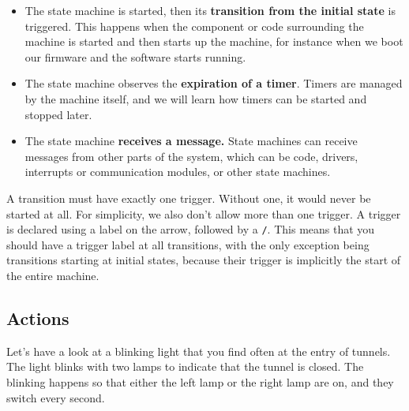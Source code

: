 \documentclass[10pt, twoside, twocolumn]{book}
\providecommand{\tightlist}{%
  \setlength{\itemsep}{0pt}\setlength{\parskip}{0pt}}
\begin{document}
\begin{itemize}
\tightlist
\item
  The state machine is started, then its \textbf{transition from the
  initial state} is triggered. This happens when the component or code
  surrounding the machine is started and then starts up the machine, for
  instance when we boot our firmware and the software starts running.
\item
  The state machine observes the \textbf{expiration of a timer}. Timers
  are managed by the machine itself, and we will learn how timers can be
  started and stopped later.
\item
  The state machine \textbf{receives a message.} State machines can
  receive messages from other parts of the system, which can be code,
  drivers, interrupts or communication modules, or other state machines.
\end{itemize}

A transition must have exactly one trigger. Without one, it would never
be started at all. For simplicity, we also don't allow more than one
trigger. A trigger is declared using a label on the arrow, followed by a
\texttt{/}. This means that you should have a trigger label at all
transitions, with the only exception being transitions starting at
initial states, because their trigger is implicitly the start of the
entire machine.

\hypertarget{actions}{%
\subsection{Actions}\label{actions}}

Let's have a look at a blinking light that you find often at the entry
of tunnels. The light blinks with two lamps to indicate that the tunnel
is closed. The blinking happens so that either the left lamp or the
right lamp are on, and they switch every second.
\end{document}

